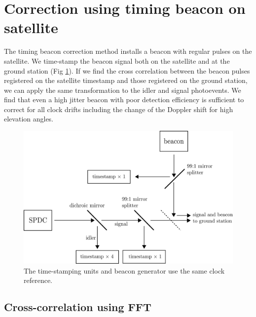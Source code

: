 \section{Correction using timing beacon on satellite}
The timing beacon correction method installs a beacon with regular pulses on the satellite. We time-stamp the beacon signal both on the satellite and at the ground station (Fig \ref{fig:beacon}). If we find the cross correlation between the beacon pulses registered on the satellite timestamp and those registered on the ground station, we can apply the same transformation to the idler and signal photoevents. We find that even a high jitter beacon with poor detection efficiency is sufficient to correct for all clock drifts including the change of the Doppler shift for high elevation angles.

\begin{figure}[ht!]
	\includegraphics[width=0.97\linewidth]{assets/beacon}
	\caption{The time-stamping units and beacon generator use the same clock reference.}
	\label{fig:beacon}
\end{figure}

\subsection{Cross-correlation using FFT}

